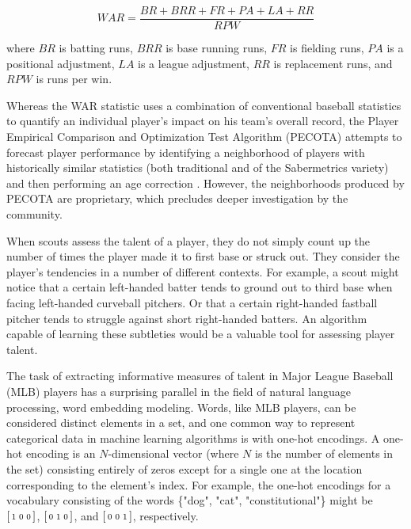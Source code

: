 \documentclass{article}
\begin{document}
\begin{equation}
\label{eqn:war}
WAR = \frac{BR + BRR + FR + PA + LA + RR}{RPW}
\end{equation}

where $BR$ is batting runs, $BRR$ is base running runs, $FR$ is fielding runs, $PA$ is a positional adjustment, $LA$ is a league adjustment, $RR$ is replacement runs, and $RPW$ is runs per win.

Whereas the WAR statistic uses a combination of conventional baseball statistics to quantify an individual player's impact on his team's overall record, the Player Empirical Comparison and Optimization Test Algorithm (PECOTA) attempts to forecast player performance by identifying a neighborhood of players with historically similar statistics (both traditional and of the Sabermetrics variety) and then performing an age correction \parencite{PECOTA}. However, the neighborhoods produced by PECOTA are proprietary, which precludes deeper investigation by the community.

When scouts assess the talent of a player, they do not simply count up the number of times the player made it to first base or struck out. They consider the player's tendencies in a number of different contexts. For example, a scout might notice that a certain left-handed batter tends to ground out to third base when facing left-handed curveball pitchers. Or that a certain right-handed fastball pitcher tends to struggle against short right-handed batters. An algorithm capable of learning these subtleties would be a valuable tool for assessing player talent.

The task of extracting informative measures of talent in Major League Baseball (MLB) players has a surprising parallel in the field of natural language processing, word embedding modeling. Words, like MLB players, can be considered distinct elements in a set, and one common way to represent categorical data in machine learning algorithms is with one-hot encodings. A one-hot encoding is an $N$-dimensional vector (where $N$ is the number of elements in the set) consisting entirely of zeros except for a single one at the location corresponding to the element's index. For example, the one-hot encodings for a vocabulary consisting of the words \{"dog", "cat", "constitutional"\} might be $\begin{bsmallmatrix} 1 & 0 & 0 \end{bsmallmatrix}$, $\begin{bsmallmatrix} 0 & 1 & 0 \end{bsmallmatrix}$, and $\begin{bsmallmatrix} 0 & 0 & 1 \end{bsmallmatrix}$, respectively.
\end{document}
